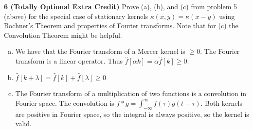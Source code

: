\documentclass[12pt,letterpaper,fleqn]{hmcpset}
\begin{document}
\newpage

\textbf{6 (Totally Optional Extra Credit)} Prove (a), (b), and (c) from problem 5 (above) for the special
case of stationary kernels $\kappa(x,y) = \kappa(x-y)$ using Bochner's Theorem and properties of
Fourier transforms. Note that for (c) the Convolution Theorem might be helpful.

\vspace{12mm}

\begin{enumerate}[(a)]
    \item 
        We have that the Fourier transform of a Mercer kernel is $\geq 0$. The Fourier transform is a linear operator. Thus $\hat{f}[\alpha k] = \alpha \hat{f}[k] \geq 0$.
    \item
        $\hat{f}[k + \lambda] = \hat{f}[k] + \hat{f}[\lambda] \geq 0$
    \item
        The Fourier transform of a multiplication of two functions is a convolution in Fourier space. The convolution is $f * g = \int_{-\infty}^{\infty} f(\tau)g(t-\tau)$. Both kernels are positive in Fourier space, so the integral is always positive, so the kernel is valid.

\end{enumerate}
\end{document}
